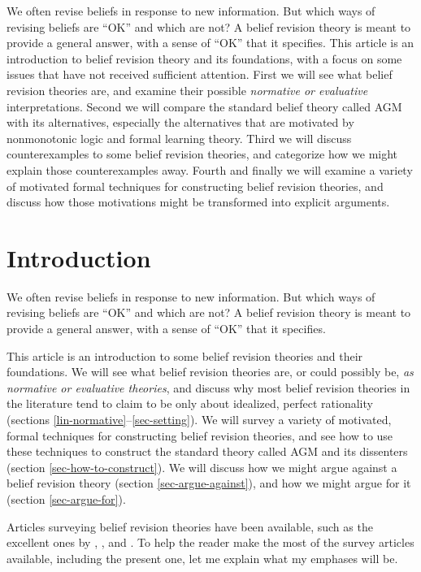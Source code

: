We often revise beliefs in response to new information. But which ways of revising beliefs are ``OK'' and which are not? A belief revision theory is meant to provide a general answer, with a sense of ``OK'' that it specifies. This article is an introduction to belief revision theory and its foundations, with a focus on some issues that have not received sufficient attention. First we will see what belief revision theories are, and examine their possible {\em normative or evaluative} interpretations. Second we will compare the standard belief theory called AGM with its alternatives, especially the alternatives that are motivated by nonmonotonic logic and formal learning theory. Third we will discuss counterexamples to some belief revision theories, and categorize how we might explain those counterexamples away. Fourth and finally we will examine a variety of motivated formal techniques for constructing belief revision theories, and discuss how those motivations might be transformed into explicit arguments.


\section{Introduction}\label{lin-intro}

We often revise beliefs in response to new information. But which ways of revising beliefs are ``OK'' and which are not? A belief revision theory is meant to provide a general answer, with a sense of ``OK'' that it specifies.

This article is an introduction to some belief revision theories and their foundations. We will see what belief revision theories are, or could possibly be, {\em as normative or evaluative theories}, and discuss why most belief revision theories in the literature tend to claim to be only about idealized, perfect rationality (sections \ref{lin-normative}--\ref{sec-setting}). We will survey a variety of motivated, formal techniques for constructing belief revision theories, and see how to use these techniques to construct the standard theory called AGM and its dissenters (section \ref{sec-how-to-construct}). We will discuss how we might argue against a belief revision theory (section \ref{sec-argue-against}), and how we might argue for it (section \ref{sec-argue-for}). 

Articles surveying belief revision theories have been available, such as the excellent ones by \citet{sep-logic-belief-revision}, \citet*{rodrigues2011belief}, and \citet{huber2013belief-i,huber2013belief-ii}. To help the reader make the most of the survey articles available, including the present one, let me explain what my emphases will be. \op

